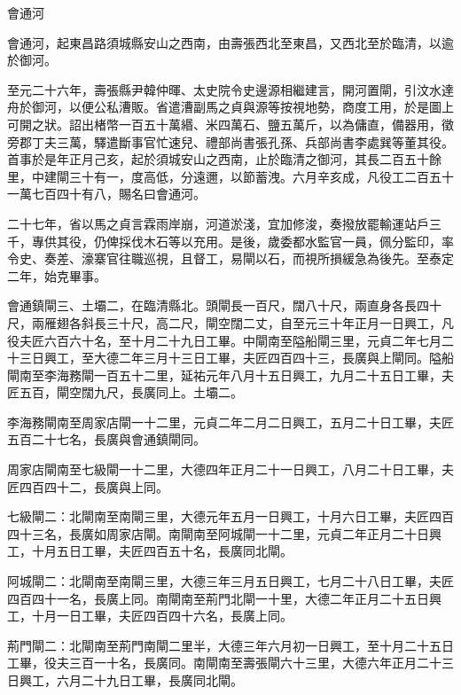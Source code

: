 \begin{pinyinscope}
 會通河



 會通河，起東昌路須城縣安山之西南，由壽張西北至東昌，又西北至於臨清，以逾於御河。



 至元二十六年，壽張縣尹韓仲暉、太史院令史邊源相繼建言，開河置閘，引汶水達舟於御河，以便公私漕販。省遣漕副馬之貞與源等按視地勢，商度工用，於是圖上可開之狀。詔出楮幣一百五十萬緡、米四萬石、鹽五萬斤，以為傭直，備器用，徵旁郡丁夫三萬，驛遣斷事官忙速兒、禮部尚書張孔孫、兵部尚書李處巽等董其役。首事於是年正月己亥，起於須城安山之西南，止於臨清之御河，其長二百五十餘里，中建閘三十有一，度高低，分遠邇，以節蓄洩。六月辛亥成，凡役工二百五十一萬七百四十有八，賜名曰會通河。



 二十七年，省以馬之貞言霖雨岸崩，河道淤淺，宜加修浚，奏撥放罷輸運站戶三千，專供其役，仍俾採伐木石等以充用。是後，歲委都水監官一員，佩分監印，率令史、奏差、濠寨官往職巡視，且督工，易閘以石，而視所損緩急為後先。至泰定二年，始克畢事。



 會通鎮閘三、土壩二，在臨清縣北。頭閘長一百尺，闊八十尺，兩直身各長四十尺，兩雁翅各斜長三十尺，高二尺，閘空闊二丈，自至元三十年正月一日興工，凡役夫匠六百六十名，至十月二十九日工畢。中閘南至隘船閘三里，元貞二年七月二十三日興工，至大德二年三月十三日工畢，夫匠四百四十三，長廣與上閘同。隘船閘南至李海務閘一百五十二里，延祐元年八月十五日興工，九月二十五日工畢，夫匠五百，閘空闊九尺，長廣同上。土壩二。



 李海務閘南至周家店閘一十二里，元貞二年二月二日興工，五月二十日工畢，夫匠五百二十七名，長廣與會通鎮閘同。



 周家店閘南至七級閘一十二里，大德四年正月二十一日興工，八月二十日工畢，夫匠四百四十二，長廣與上同。



 七級閘二：北閘南至南閘三里，大德元年五月一日興工，十月六日工畢，夫匠四百四十三名，長廣如周家店閘。南閘南至阿城閘一十二里，元貞二年正月二十日興工，十月五日工畢，夫匠四百五十名，長廣同北閘。



 阿城閘二：北閘南至南閘三里，大德三年三月五日興工，七月二十八日工畢，夫匠四百四十一名，長廣上同。南閘南至荊門北閘一十里，大德二年正月二十五日興工，十月一日工畢，夫匠四百四十六名，長廣上同。



 荊門閘二：北閘南至荊門南閘二里半，大德三年六月初一日興工，至十月二十五日工畢，役夫三百一十名，長廣同。南閘南至壽張閘六十三里，大德六年正月二十三日興工，六月二十九日工畢，長廣同北閘。




\end{pinyinscope}
